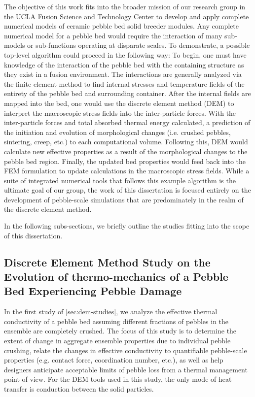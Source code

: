 The objective of this work fits into the broader mission of our research group in the UCLA Fusion Science and Technology Center to develop and apply complete numerical models of ceramic pebble bed solid breeder modules. Any complete numerical model for a pebble bed would require the interaction of many sub-models or sub-functions operating at disparate scales. To demonstrate, a possible top-level algorithm could proceed in the following way: To begin, one must have knowledge of the interaction of the pebble bed with the containing structure as they exist in a fusion environment. The interactions are generally analyzed via the finite element method to find internal stresses and temperature fields of the entirety of the pebble bed and surrounding container. After the internal fields are mapped into the bed, one would use the discrete element method (DEM) to interpret the macroscopic stress fields into the inter-particle forces. With the inter-particle forces and total absorbed thermal energy calculated, a prediction of the initiation and evolution of morphological changes (i.e. crushed pebbles, sintering, creep, etc.) to each computational volume. Following this, DEM would calculate new effective properties as a result of the morphological changes to the pebble bed region. Finally, the updated bed properties would feed back into the FEM formulation to update calculations in the macroscopic stress fields. While a suite of integrated numerical tools that follows this example algorithm is the ultimate goal of our group, the work of this dissertation is focused entirely on the development of pebble-scale simulations that are predominately in the realm of the discrete element method.

In the following subs-sections, we briefly outline the studies fitting into the scope of this dissertation. 


\subsection*{Discrete Element Method Study on the Evolution of thermo-mechanics of a Pebble Bed Experiencing Pebble Damage}
In the first study of \cref{sec:dem-studies}, we analyze the effective thermal conductivity of a pebble bed assuming different fractions of pebbles in the ensemble are completely crushed. The focus of this study is to determine the extent of change in aggregate ensemble properties due to individual pebble crushing, relate the changes in effective conductivity to quantifiable pebble-scale properties (e.g. contact force, coordination number, etc.), as well as help designers anticipate acceptable limits of pebble loss from a thermal management point of view. For the DEM tools used in this study, the only mode of heat transfer is conduction between the solid particles. 


